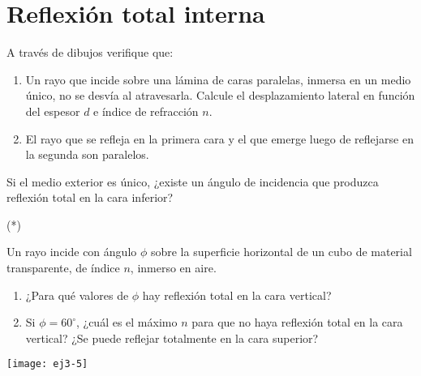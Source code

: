 \section*{Reflexión total interna}

\item A través de dibujos verifique que:
\begin{enumerate}
	\item Un rayo que incide sobre una lámina de caras paralelas, inmersa en un medio único, no se desvía al atravesarla.
	Calcule el desplazamiento lateral en función del espesor $d$ e índice de refracción $n$.
	\item El rayo que se refleja en la primera cara y el que emerge luego de reflejarse en la segunda son paralelos.
\end{enumerate}
Si el medio exterior es único, ¿existe un ángulo de incidencia que produzca reflexión total en la cara inferior?



\item (*)
\begin{minipage}[t][3.5cm]{0.75\textwidth}
Un rayo incide con ángulo $\phi$ sobre la superficie horizontal de un cubo de material transparente, de índice $n$, inmerso en aire.
\begin{enumerate}
	\item ¿Para qué valores de $\phi$ hay reflexión total en la cara vertical?
	\item Si $\phi=60^{\circ}$, ¿cuál es el máximo $n$ para que no haya reflexión total en la cara vertical?
	¿Se puede reflejar totalmente en la cara superior?
\end{enumerate}
\end{minipage}
\begin{minipage}[c][1.5cm][t]{0.15\textwidth}
	\texttt{[image: ej3-5]}
\end{minipage}



